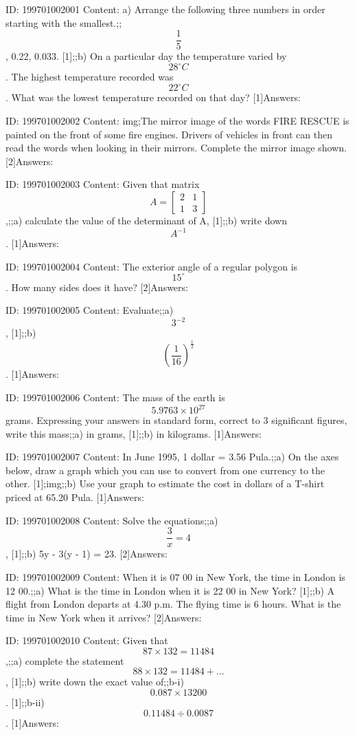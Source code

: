 \documentclass{article}
\begin{document}
ID: 199701002001
Content:
a) Arrange the following three numbers in order starting with the smallest.;;$$\frac{1}{5}$$, 0.22, 0.033. [1];;b) On a particular day the temperature varied by $$28^{\circ}C$$. The highest temperature recorded was $$22^{\circ}C$$. What was the lowest temperature recorded on that day? [1]Answers:

ID: 199701002002
Content:
img;The mirror image of the words FIRE RESCUE is painted on the front of some fire engines. Drivers of vehicles in front can then read the words when looking in their mirrors. Complete the mirror image shown. [2]Answers:

ID: 199701002003
Content:
Given that matrix $$A=\begin{bmatrix}2&1\\1&3\end{bmatrix}$$,;;a) calculate the value of the determinant of A, [1];;b) write down $$A^{-1}$$ . [1]Answers:

ID: 199701002004
Content:
The exterior angle of a regular polygon is $$15^{\circ}$$. How many sides does it have? [2]Answers:

ID: 199701002005
Content:
Evaluate;;a) $$3^{-2}$$, [1];;b) $$(\frac{1}{16})^{\frac{1}{2}}$$. [1]Answers:

ID: 199701002006
Content:
The mass of the earth is $$5.9763 \times 10^{27}$$ grams. Expressing your answers in standard form, correct to 3 significant figures, write this mass;;a) in grams, [1];;b) in kilograms. [1]Answers:

ID: 199701002007
Content:
In June 1995, 1 dollar = 3.56 Pula.;;a) On the axes below, draw a graph which you can use to convert from one currency to the other. [1];img;;b) Use your graph to estimate the cost in dollars of a T-shirt priced at 65.20 Pula. [1]Answers:

ID: 199701002008
Content:
Solve the equations;;a) $$\frac{3}{x}=4$$, [1];;b) 5y - 3(y - 1) = 23. [2]Answers:

ID: 199701002009
Content:
When it is 07 00 in New York, the time in London is 12 00.;;a) What is the time in London when it is 22 00 in New York? [1];;b) A flight from London departs at 4.30 p.m. The flying time is 6 hours. What is the time in New York when it arrives? [2]Answers:

ID: 199701002010
Content:
Given that $$87 \times 132 = 11484$$,;;a) complete the statement $$88 \times 132 = 11484+...$$, [1];;b) write down the exact value of;;b-i) $$0.087 \times 13200$$. [1];;b-ii) $$0.11484 \div 0.0087$$. [1]Answers:
\end{document}
